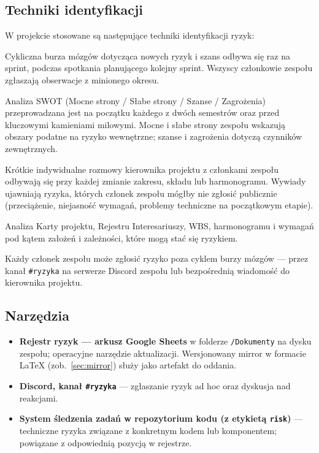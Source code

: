 \documentclass[11pt,a4paper]{article}
\begin{document}
	\subsection{Techniki identyfikacji}
	W projekcie stosowane są następujące techniki identyfikacji ryzyk:
	\begin{description}[style=nextline]
		\item[Burza mózgów]
		Cykliczna burza mózgów dotycząca nowych ryzyk i szans odbywa się raz na sprint, podczas spotkania planującego kolejny sprint. Wszyscy członkowie zespołu zgłaszają obserwacje z minionego okresu.
		
		\item[SWOT]
		Analiza SWOT (Mocne strony / Słabe strony / Szanse / Zagrożenia) przeprowadzana jest na początku każdego z dwóch semestrów oraz przed kluczowymi kamieniami milowymi. Mocne i słabe strony zespołu wskazują obszary podatne na ryzyko wewnętrzne; szanse i zagrożenia dotyczą czynników zewnętrznych.
		
		\item[Wywiady]
		Krótkie indywidualne rozmowy kierownika projektu z członkami zespołu odbywają się przy każdej zmianie zakresu, składu lub harmonogramu. Wywiady ujawniają ryzyka, których członek zespołu mógłby nie zgłosić publicznie (przeciążenie, niejasność wymagań, problemy techniczne na początkowym etapie).
		
		\item[Przegląd dokumentacji]
		Analiza Karty projektu, Rejestru Interesariuszy, WBS, harmonogramu i wymagań pod kątem założeń i zależności, które mogą stać się ryzykiem.
		
		\item[Zgłoszenia ad hoc]
		Każdy członek zespołu może zgłosić ryzyko poza cyklem burzy mózgów --- przez kanał \texttt{\#ryzyka} na serwerze Discord zespołu lub bezpośrednią wiadomość do kierownika projektu.
	\end{description}
	
	\subsection{Narzędzia}
	\begin{itemize}[noitemsep]
		\item \textbf{Rejestr ryzyk --- arkusz Google Sheets} w folderze \texttt{/Dokumenty} na dysku zespołu; operacyjne narzędzie aktualizacji. Wersjonowany mirror w formacie \LaTeX{} (zob.\ \cref{sec:mirror}) służy jako artefakt do oddania.
		\item \textbf{Discord, kanał \texttt{\#ryzyka}} --- zgłaszanie ryzyk ad hoc oraz dyskusja nad reakcjami.
		\item \textbf{System śledzenia zadań w repozytorium kodu (z etykietą \texttt{risk})} --- techniczne ryzyka związane z konkretnym kodem lub komponentem; powiązane z odpowiednią pozycją w rejestrze.
	\end{itemize}
	
\end{document}
